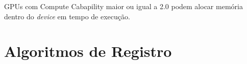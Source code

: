 GPUs com Compute Cabapility maior ou igual a 2.0 podem alocar memória dentro do \textit{device} em tempo de execução.

\section{Algoritmos de Registro}\label{sec:algReg}